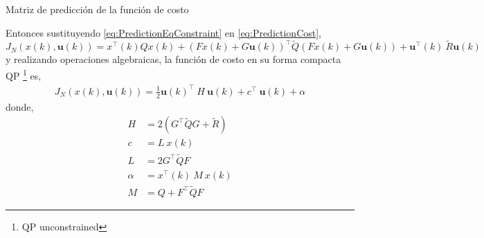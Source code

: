 \documentclass[8pt]{beamer}
\begin{document}
\begin{frame}[fragile]{Matriz de predicción de la función de costo}	

	Entonces sustituyendo \eqref{eq:PredictionEqConstraint} en \eqref{eq:PredictionCost},
	\begin{equation*}
		J_N(x(k),\mathbf{u}(k)) =  x^\intercal(k) Q x(k) + ( F x(k)+G \mathbf{u}(k) )^\intercal \tilde{Q} ( F x(k)+G \mathbf{u}(k) ) + \mathbf{u}^\intercal(k)~\tilde{R} \mathbf{u}(k)
	\end{equation*}
	y realizando operaciones algebraicas, la función de costo en su forma compacta QP \footnote{QP unconstrained} es,
	\begin{align}
		J_N(x(k),\mathbf{u}(k)) = \frac{1}{2} \mathbf{u}(k)^\intercal~H~\mathbf{u}(k)+c^\intercal~\mathbf{u}(k)+\alpha
	\end{align}
	donde, 
	\begin{equation}
	\begin{aligned}
		H      & =2(G^\intercal\tilde{Q}G+\tilde{R}) \\
		c      & =L~x(k)                             \\
		L      & = 2G^\intercal\tilde{Q}F            \\
		\alpha & =x^\intercal(k)~M~x(k)              \\
		M      & =Q+F^\intercal\tilde{Q}F
	\end{aligned}
	\end{equation}

\end{frame}
\end{document}
